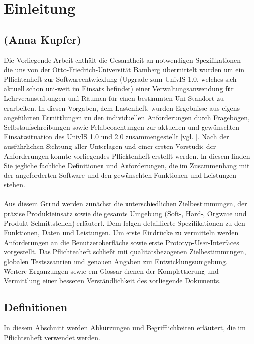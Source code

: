 \section{Einleitung}
\label{sec:Einleitung}

\subsection*{(Anna Kupfer)}

Die Vorliegende Arbeit enthält die Gesamtheit an notwendigen Spezifikationen die uns von der Otto-Friedrich-Universität Bamberg übermittelt wurden um ein Pflichtenheft zur Softwareentwicklung (Upgrade zum UnivIS 1.0, welches sich aktuell schon uni-weit im Einsatz befindet) einer Verwaltungsanwendung für Lehrveranstaltungen und Räumen für einen bestimmten Uni-Standort zu erarbeiten.
In diesen Vorgaben, dem Lastenheft, wurden Ergebnisse aus eigens angeführten Ermittlungen zu den individuellen Anforderungen durch Fragebögen, Selbstaufschreibungen sowie Feldbeoachtungen zur aktuellen und gewünschten Einsatzsituation des UnivIS 1.0 und 2.0 zusammengestellt [vgl. \cite{Balzert09}].
Nach der ausführlichen Sichtung aller Unterlagen und einer ersten Vorstudie der Anforderungen konnte vorliegendes Pflichtenheft erstellt werden. In diesem finden Sie jegliche fachliche Definitionen und Anforderungen, die im Zusammenhang mit der angeforderten Software und den gewünschten Funktionen und Leistungen stehen.
\\
\\
Aus diesem Grund werden zunächst die unterschiedlichen Zielbestimmungen, der präzise Produkteinsatz sowie die gesamte Umgebung (Soft-, Hard-, Orgware und Produkt-Schnittstellen) erläutert.
Dem folgen detaillierte Spezifikationen zu den Funktionen, Daten und Leistungen. Um erste Eindrücke zu vermitteln werden Anforderungen an die Benutzeroberfläche sowie erste Prototyp-User-Interfaces vorgestellt. Das Pflichtenheft schließt mit qualitätsbezogenen Zielbestimmungen, globalen Testszeanrien und genauen Angaben zur Entwicklungsumgebung.
Weitere Ergänzungen sowie ein Glossar dienen der Komplettierung und Vermittlung einer besseren Verständlichkeit des vorliegende Dokuments.

\subsection{Definitionen}
\label{sec:Definitionen}

In diesem Abschnitt werden Abkürzungen und Begrifflichkeiten erläutert, die im Pflichtenheft verwendet werden. \\[0.25cm]


